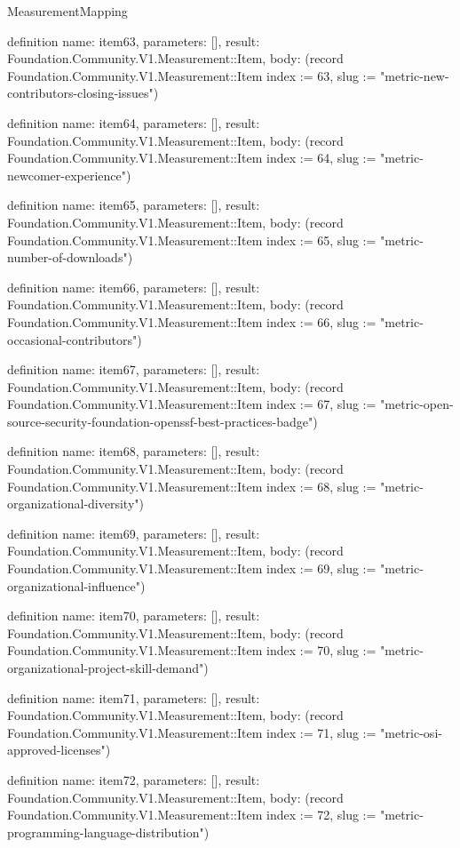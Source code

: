\begin{lexlean}{MeasurementMapping}
\begin{semanticmodule}
definition{
  name: item63,
  parameters: [],
  result: Foundation.Community.V1.Measurement::Item,
  body: (record Foundation.Community.V1.Measurement::Item {index := 63, slug := "metric-new-contributors-closing-issues"})
}

definition{
  name: item64,
  parameters: [],
  result: Foundation.Community.V1.Measurement::Item,
  body: (record Foundation.Community.V1.Measurement::Item {index := 64, slug := "metric-newcomer-experience"})
}

definition{
  name: item65,
  parameters: [],
  result: Foundation.Community.V1.Measurement::Item,
  body: (record Foundation.Community.V1.Measurement::Item {index := 65, slug := "metric-number-of-downloads"})
}

definition{
  name: item66,
  parameters: [],
  result: Foundation.Community.V1.Measurement::Item,
  body: (record Foundation.Community.V1.Measurement::Item {index := 66, slug := "metric-occasional-contributors"})
}

definition{
  name: item67,
  parameters: [],
  result: Foundation.Community.V1.Measurement::Item,
  body: (record Foundation.Community.V1.Measurement::Item {index := 67, slug := "metric-open-source-security-foundation-openssf-best-practices-badge"})
}

definition{
  name: item68,
  parameters: [],
  result: Foundation.Community.V1.Measurement::Item,
  body: (record Foundation.Community.V1.Measurement::Item {index := 68, slug := "metric-organizational-diversity"})
}

definition{
  name: item69,
  parameters: [],
  result: Foundation.Community.V1.Measurement::Item,
  body: (record Foundation.Community.V1.Measurement::Item {index := 69, slug := "metric-organizational-influence"})
}

definition{
  name: item70,
  parameters: [],
  result: Foundation.Community.V1.Measurement::Item,
  body: (record Foundation.Community.V1.Measurement::Item {index := 70, slug := "metric-organizational-project-skill-demand"})
}

definition{
  name: item71,
  parameters: [],
  result: Foundation.Community.V1.Measurement::Item,
  body: (record Foundation.Community.V1.Measurement::Item {index := 71, slug := "metric-osi-approved-licenses"})
}

definition{
  name: item72,
  parameters: [],
  result: Foundation.Community.V1.Measurement::Item,
  body: (record Foundation.Community.V1.Measurement::Item {index := 72, slug := "metric-programming-language-distribution"})
}


\end{semanticmodule}
\end{lexlean}
